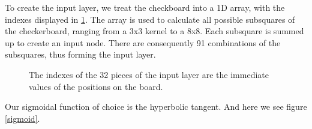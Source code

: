 \documentclass[12pt,a4paper]{article}
\newcommand{\bl}{\node [ball, ball color=black!80!white, draw=black!65!white, thin]{};}
\newcommand{\wh}{\node [ball, ball color=white] {};}
\begin{document}
To create the input layer, we treat the checkboard into a 1D array, with the indexes displayed in \ref{boardarray}. The array is used to calculate all possible subsquares of the checkerboard, ranging from a 3x3 kernel to a 8x8. Each subsquare is summed up to create an input node. There are consequently 91 combinations of the subsquares, thus forming the input layer. 

\begin{figure}[ht!]
    \centering

    \caption{The indexes of the 32 pieces of the input layer are the immediate values of the positions on the board. \label{boardarray}}
\end{figure}


Our sigmoidal function of choice is the hyperbolic tangent.  And here we see figure \ref{sigmoid}.
\end{document}
